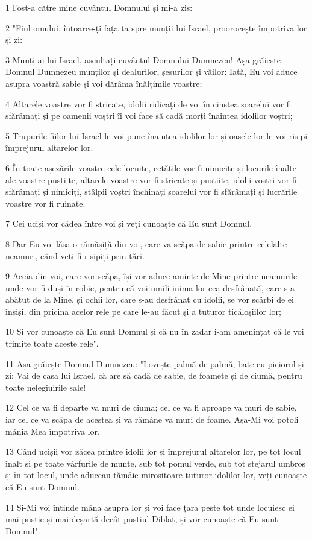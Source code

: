 \par 1 Fost-a către mine cuvântul Domnului și mi-a zis:
\par 2 "Fiul omului, întoarce-ți fața ta spre munții lui Israel, proorocește împotriva lor și zi:
\par 3 Munți ai lui Israel, ascultați cuvântul Domnului Dumnezeu! Așa grăiește Domnul Dumnezeu munților și dealurilor, șesurilor și văilor: Iată, Eu voi aduce asupra voastră sabie și voi dărâma înălțimile voastre;
\par 4 Altarele voastre vor fi stricate, idolii ridicați de voi în cinstea soarelui vor fi sfărâmați și pe oamenii voștri îi voi face să cadă morți înaintea idolilor voștri;
\par 5 Trupurile fiilor lui Israel le voi pune înaintea idolilor lor și oasele lor le voi risipi împrejurul altarelor lor.
\par 6 În toate așezările voastre cele locuite, cetățile vor fi nimicite și locurile înalte ale voastre pustiite, altarele voastre vor fi stricate și pustiite, idolii voștri vor fi sfărâmați și nimiciți, stâlpii voștri închinați soarelui vor fi sfărâmați și lucrările voastre vor fi ruinate.
\par 7 Cei uciși vor cădea între voi și veți cunoaște că Eu sunt Domnul.
\par 8 Dar Eu voi lăsa o rămășiță din voi, care va scăpa de sabie printre celelalte neamuri, când veți fi risipiți prin țări.
\par 9 Aceia din voi, care vor scăpa, își vor aduce aminte de Mine printre neamurile unde vor fi duși în robie, pentru că voi umili inima lor cea desfrânată, care s-a abătut de la Mine, și ochii lor, care s-au desfrânat cu idolii, se vor scârbi de ei înșiși, din pricina acelor rele pe care le-au făcut și a tuturor ticăloșiilor lor;
\par 10 Și vor cunoaște că Eu sunt Domnul și că nu în zadar i-am amenințat că le voi trimite toate aceste rele".
\par 11 Așa grăiește Domnul Dumnezeu: "Lovește palmă de palmă, bate cu piciorul și zi: Vai de casa lui Israel, că are să cadă de sabie, de foamete și de ciumă, pentru toate nelegiuirile sale!
\par 12 Cel ce va fi departe va muri de ciumă; cel ce va fi aproape va muri de sabie, iar cel ce va scăpa de acestea și va rămâne va muri de foame. Așa-Mi voi potoli mânia Mea împotriva lor.
\par 13 Când ucișii vor zăcea printre idolii lor și împrejurul altarelor lor, pe tot locul înalt și pe toate vârfurile de munte, sub tot pomul verde, sub tot stejarul umbros și în tot locul, unde aduceau tămâie mirositoare tuturor idolilor lor, veți cunoaște că Eu sunt Domnul.
\par 14 Și-Mi voi întinde mâna asupra lor și voi face țara peste tot unde locuiesc ei mai pustie și mai deșartă decât pustiul Diblat, și vor cunoaște că Eu sunt Domnul".

